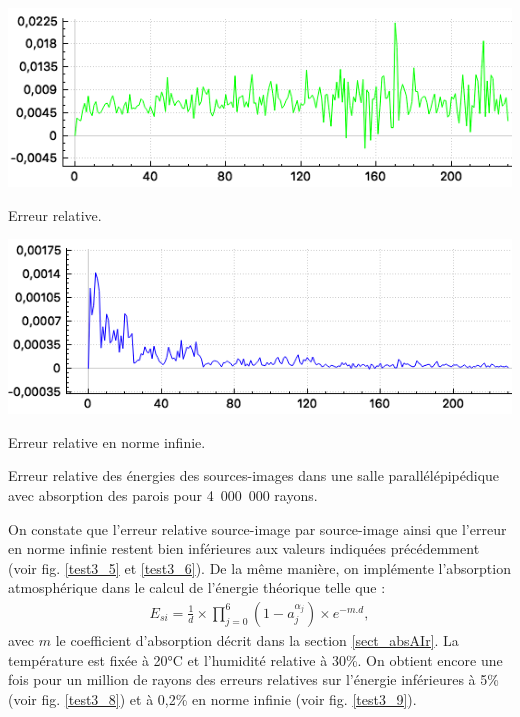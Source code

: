 \begin{figureth}
	\begin{subfigureth}{0.8\textwidth}
		\includegraphics[width=\linewidth]{images/test3_5}
		\caption{Erreur relative.}
		\label{test3_5}
	\end{subfigureth}
	\begin{subfigureth}{0.8\textwidth}
		\includegraphics[width=\linewidth]{images/test3_6}
		\caption{Erreur relative en norme infinie.}
		\label{test3_6}
	\end{subfigureth}
	\caption{Erreur relative des énergies des sources-images dans une salle parallélépipédique avec absorption des parois pour 4~000~000 rayons.}
\end{figureth}


On constate que l'erreur relative source-image par source-image ainsi que l'erreur en norme infinie restent bien inférieures aux valeurs indiquées précédemment (voir fig. \ref{test3_5} et \ref{test3_6}). De la même manière, on implémente l'absorption atmosphérique dans le calcul de l'énergie théorique telle que :
\begin{align}
E_{si} = \frac{1}{d} \times \prod_{j=0}^{6}{(1-a_j^{\alpha_j})} \times e^{-m.d}, 
\end{align}
avec $m$ le coefficient d'absorption décrit dans la section \ref{sect_absAIr}. La température est fixée à 20°C et l'humidité relative à 30\%. On obtient encore une fois pour un million de rayons des erreurs relatives sur l'énergie inférieures à 5\% (voir fig. \ref{test3_8}) et à 0,2\% en norme infinie (voir fig. \ref{test3_9}).


